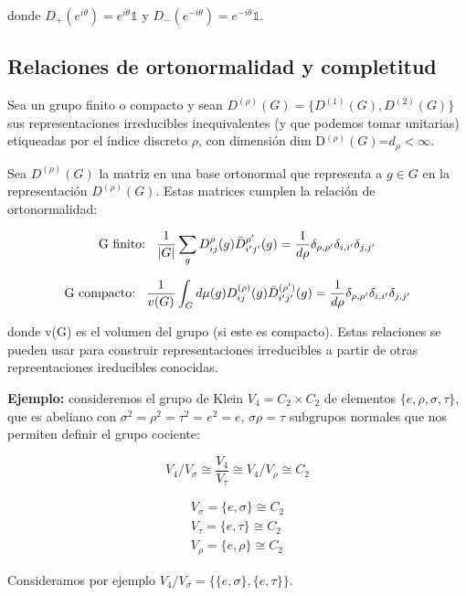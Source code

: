 \documentclass{article}
\begin{document}
    donde $D_+(e^{i\theta})=e^{i\theta}\mathds{1}$ y $D_-(e^{-i\theta})=e^{-i\theta}\mathds{1}$.

    \subsection{Relaciones de ortonormalidad y completitud}

    Sea un grupo finito o compacto y sean $D^{(\rho)}(G)=\lbrace D^{(1)}(G), D^{(2)}(G)\rbrace$ sus representaciones irreducibles inequivalentes (y que podemos tomar unitarias) etiqueadas por el índice discreto $\rho$, con dimensión dim D$^{(\rho)}(G)$=$d_\rho <\infty$.

    Sea $D^{(\rho)}(G)$ la matriz en una base ortonormal que representa a $g\in G$ en la representación $D^{(\rho )}(G)$. Estas matrices cumplen la relación de ortonormalidad:

    $$\text{G finito:} \hspace{0.3cm} \frac{1}{|G|}\sum _g D_{ij}^\rho (g) \bar{D}_{i'j'}^{\rho '}(g)=\frac{1}{d \rho}\delta _{\rho , \rho '}\delta _{i, i'}\delta _{j,j'}$$

    $$\text{G compacto:} \hspace{0.3cm} \frac{1}{v(G)}\int _G d\mu (g) D_{ij}^{(\rho )} (g) \bar{D}_{i'j'}^{ (\rho ')}(g)=\frac{1}{d\rho}\delta _{\rho , \rho '}\delta _{i, i'}\delta _{j,j'}$$

    donde v(G) es el volumen del grupo (si este es compacto). Estas relaciones se pueden usar para construir representaciones irreducibles a partir de otras repreentaciones ireducibles conocidas.

    \smallskip

    \textbf{Ejemplo:} consideremos el grupo de Klein $V_4=C_2 \times C_2$ de elementos $\lbrace e, \rho , \sigma , \tau \rbrace $, que es abeliano con $\sigma ^2 = \rho ^2 = \tau ^2 =e^2 =e$, $\sigma \rho = \tau$ subgrupos normales que nos permiten definir el grupo cociente:

    $$V_4/V_\sigma \cong \frac{V_4}{V_\tau}\cong V_4/V_\rho \cong C_2 $$

    $$\begin{array}{c}
         V_\sigma =\lbrace e, \sigma \rbrace \cong C_2  \\
         V_\tau = \lbrace e, \tau \rbrace \cong C_2 \\
         V_\rho = \lbrace e, \rho \rbrace  \cong C_2
    \end{array}$$

    \smallskip
    Consideramos por ejemplo $V_4/V_\sigma =\lbrace \lbrace e, \sigma \rbrace , \lbrace e, \tau \rbrace \rbrace$.
    \bigskip
\end{document}
